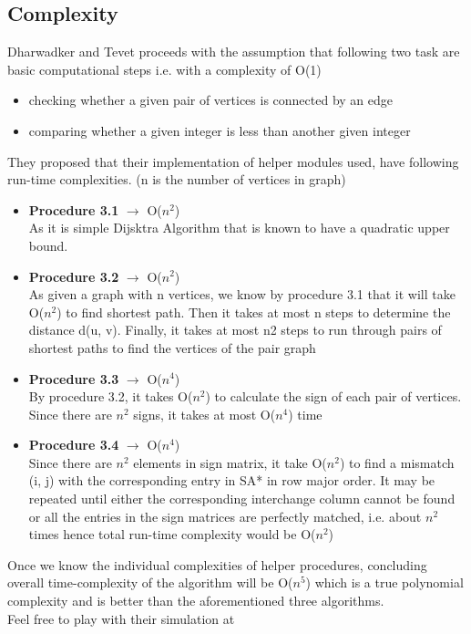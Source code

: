 \documentclass[11pt]{article}
\begin{document}
\subsection{Complexity}
Dharwadker and Tevet proceeds with the assumption that following two task are basic computational steps i.e. with a complexity of O(1)\\
\begin{itemize}
    \item checking whether a given pair of vertices is connected by an edge
    \item comparing whether a given integer is less than another given integer
\end{itemize}
They proposed that their implementation of helper modules used, have following run-time complexities. (n is the number of vertices in graph)\\
\begin{itemize}
    \item \textbf{Procedure 3.1} $\rightarrow$ O($n^2$)\\
    As it is simple Dijsktra Algorithm that is known to have a quadratic upper bound.
    \item \textbf{Procedure 3.2} $\rightarrow$ O($n^2$)\\
    As given a graph with n vertices, we know by procedure 3.1 that it will take O($n^2$) to find shortest path. Then it takes at most n steps to determine the distance d(u, v). Finally, it takes at most n2 steps to run through pairs of shortest paths to find the vertices of the pair graph\\
    \item \textbf{Procedure 3.3} $\rightarrow$ O($n^4$)\\
    By procedure 3.2, it takes O($n^2$) to calculate the sign of each pair of vertices. Since there are $n^2$ signs, it takes at most O($n^4$) time
    \item \textbf{Procedure 3.4} $\rightarrow$ O($n^4$)\\
    Since there are $n^2$ elements in sign matrix, it take O($n^2$) to find a mismatch (i, j) with the corresponding entry in SA* in row major order. It may be repeated until either the corresponding interchange column cannot be found or all the entries in the sign matrices are perfectly matched, i.e. about $n^2$ times hence total run-time complexity would be O($n^2$)\\
\end{itemize}
Once we know the individual complexities of helper procedures, concluding overall time-complexity of the algorithm will be O($n^5$) which is a true polynomial complexity and is better than the aforementioned three algorithms.\\
Feel free to play with their simulation at \cite{dharwadker2009graph}
\end{document}
